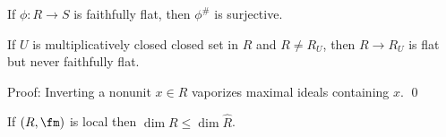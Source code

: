 \begin{cor}
If $\phi: R \to S$ is faithfully flat, then $\phi^\#$ is surjective. 
\end{cor}

\begin{cor}
If $U$ is multiplicatively closed closed set in $R$ and $R \neq R_U$, then $R \to R_U$ is flat but never faithfully flat. 
\end{cor}

\noindent Proof: Inverting a nonunit $x \in R$ vaporizes maximal ideals containing $x$. \qed \\

\begin{cor}
If $(R,\fm)$ is local then $\dim R \leq \dim \hat{R}$.
\end{cor}

